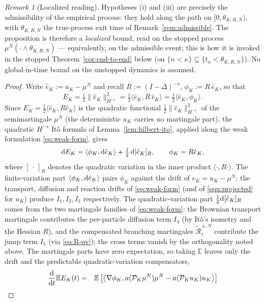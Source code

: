 \documentclass[a4paper,fleqn]{cas-sc}
\theoremstyle{definition}
\theoremstyle{remark}
\newtheorem{remark}[theorem]{Remark}
\begin{document}
\begin{remark}[Localized reading]\label{rem:propu_K_mu-localized}
Hypotheses (i) and (iii) are precisely the admissibility of the empirical process: they hold along
the path on $[0,\theta_{K,R,N})$, with $\theta_{K,R,N}$ the true-process exit time of
Remark~\ref{rem:admissible}. The proposition is therefore a \emph{localized} bound, read on the
stopped process $\mu^N(\cdot\wedge\theta_{K,R,N})$ --- equivalently, on the admissible event; this is
how it is invoked in the stopped Theorem~\ref{cor:end-to-end} below (on $\{n<\kappa\}\subseteq\{t_n<\theta_{K,R,N}\}$).
No global-in-time bound on the unstopped dynamics is assumed.
\end{remark}
 \begin{proof}
Write $\widehat e_K:=u_K-\mu^N$ and recall $R:=(I-\Delta)^{-s}$,
$\phi_K:=R\,\widehat e_K$, so that
\[
E_K=\tfrac12\|\widehat e_K\|_{H^{-s}}^2
=\tfrac12\langle\widehat e_K,R\,\widehat e_K\rangle
=\tfrac12\langle\widehat e_K,\phi_K\rangle .
\]
Since $E_K=\tfrac12\langle\hat e_K,R\hat e_K\rangle$ is the quadratic functional
$\tfrac12\|\hat e_K\|_{H^{-s}}^2$ of the semimartingale $\mu^N$ (the deterministic $u_K$ carries no
martingale part), the quadratic $H^{-s}$ It\^o formula of Lemma~\ref{lem:hilbert-ito}, applied along
the weak formulation \eqref{eq:weak-form}, gives
\[
\mathrm{d} E_K=\langle\phi_K,\mathrm{d}\hat e_K\rangle+\tfrac12\,\mathrm{d}[\hat e_K]_R,
\qquad \phi_K=R\hat e_K,
\]
where $[\,\cdot\,]_R$ denotes the quadratic variation in the inner product
$\langle\cdot,R\cdot\rangle$. The finite-variation part $\langle\phi_K,\mathrm{d}\hat e_K\rangle$
pairs $\phi_K$ against the drift of $\hat e_K=u_K-\mu^N$: the transport, diffusion and
reaction drifts of \eqref{eq:weak-form} (and of \eqref{equ:projected} for $u_K$)
produce $I_1,I_2,I_3$ respectively. The quadratic-variation part $\tfrac12\mathrm{d}[\hat e_K]_R$
comes from the two martingale families of \eqref{eq:weak-form}: the Brownian transport
martingale contributes the per-particle diffusion term $I_4$ (by It\^o's isometry and the
Hessian $R$), and the compensated branching martingales $\widetilde{\mathcal R}^{\pm,N}_i$
contribute the jump term $I_5$ (via \eqref{eq:R-qv}); the cross terms vanish by the
orthogonality noted above. The martingale parts have zero expectation, so taking
$\mathbb E$ leaves only the drift and the predictable quadratic-variation compensators,
\begin{equation}
 \begin{aligned}
 \frac{\intd}{\intd t} \mathbb E  E_K(t)  = &   \quad \mathbb E \left[\left\langle \nabla  \phi_K , a(\mathcal P_K \mu^N) \mu^N-  a(\mathcal P_K u_K) u_K   \right\rangle \right] \\

\end{aligned}
\end{equation}
\end{proof}
\end{document}
